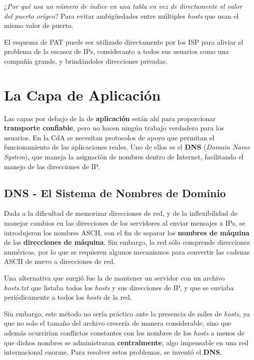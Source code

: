 \documentclass[10pt,a4paper]{article}
\begin{document}
¿\textit{Por qué usa un número de índice en una tabla en vez de directamente el valor del puerto origen}? Para evitar ambigüedades entre múltiples \textit{hosts} que usan el mismo valor de puerto.

El esquema de PAT puede ser utilizado directamente por los ISP para aliviar el problema de la escasez de IPs, consideranto a todos sus usuarios como una compañía grande, y brindándoles direcciones privadas.

\pagebreak
\section{La Capa de Aplicación}

Las capas por debajo de la de \textbf{aplicación} están ahí para proporcionar \textbf{transporte confiable}, pero no hacen ningún trabajo verdadero para los usuarios. En la CdA se necesitan protocolos de apoyo que permitan el funcionamiento de las aplicaciones reales. Uno de ellos es el \textbf{DNS} (\textit{Domain Name System}), que maneja la asignación de nombres dentro de Internet, facilitando el manejo de las direcciones de IP.

\subsection{DNS - El Sistema de Nombres de Dominio}

Dada a la dificultad de memorizar direcciones de red, y de la inflexibilidad de manejar cambios en las direcciones de los servidores al enviar mensajes a IPs, se introdujeron los nombres ASCII, con el fin de separar los \textbf{nombres de máquina} de las \textbf{direcciones de máquina}. Sin embargo, la red sólo comprende direcciones numéricas, por lo que se requieren algunos mecanismos para convertir las cadenas ASCII de nuevo a direcciones de red.

Una alternativa que surgió fue la de mantener un servidor con un archivo \textit{hosts.txt} que listaba todos los \textit{hosts} y sus direcciones de IP, y que se enviaba periódicamente a todos los \textit{hosts} de la red. 

Sin embargo, este método no sería práctico ante la presencia de miles de \textit{hosts}, ya que no solo el tamaño del archivo crecería de manera considerable, sino que además ocurrirían conflictos constantes con los nombres de los \textit{hosts} a menos de que dichos nombres se administraran \textbf{centralmente}, algo impensable en una red internacional enorme. Para resolver estos problemas, se inventó el \textbf{DNS}.
\end{document}
